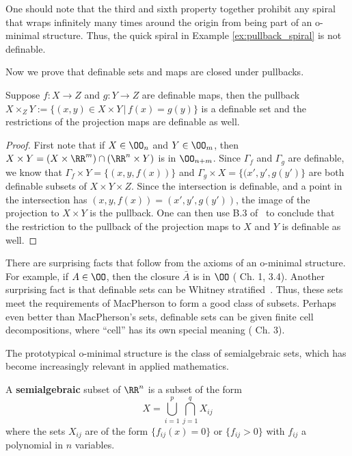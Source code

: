 \begin{rmk}
	One should note that the third and sixth property together prohibit any spiral that wraps infinitely many times around the origin from being part of an o-minimal structure. Thus, the quick spiral in Example \ref{ex:pullback_spiral} is not definable.
\end{rmk}

Now we prove that definable sets and maps are closed under pullbacks.
\begin{lem}\label{lem:def_pb}
Suppose $f:X\to Z$ and $g:Y\to Z$ are definable maps, then the pullback $X\times_Z Y:=\{(x,y)\in X\times Y\,|\, f(x)=g(y)\}$ is a definable set and the restrictions of the projection maps are definable as well.
\end{lem}
\begin{proof}
 First note that if $X\in \OO_n$ and $Y\in \OO_m$, then $X\times Y=(X\times \RR^m)\cap (\RR^n\times Y)$ is in $\OO_{n+m}$. Since $\Gamma_f$ and $\Gamma_g$ are definable, we know that $\Gamma_f\times Y=\{(x,y,f(x))\}$ and $\Gamma_g\times X=\{(x',y',g(y')\}$ are both definable subsets of $X\times Y\times Z$. Since the intersection is definable, and a point in the intersection has $(x,y,f(x))=(x',y',g(y'))$, the image of the projection to $X\times Y$ is the pullback. One can then use B.3 of~\cite{vdd-geocat} to conclude that the restriction to the pullback of the projection maps to $X$ and $Y$ is definable as well.
\end{proof}

There are surprising facts that follow from the axioms of an o-minimal structure. For example, if $A\in\OO$, then the closure $\bar{A}$ is in $\OO$ (\cite{vdd-ttos} Ch. 1, 3.4). Another surprising fact is that definable sets can be Whitney stratified~\cite{loi-verdier}. Thus, these sets meet the requirements of MacPherson to form a good class of subsets. Perhaps even better than MacPherson's sets, definable sets can be given finite cell decompositions, where ``cell'' has its own special meaning (\cite{vdd-ttos} Ch. 3).

The prototypical o-minimal structure is the class of semialgebraic sets, which has become increasingly relevant in applied mathematics.

\begin{defn}
	A \textbf{semialgebraic} subset of $\RR^n$ is a subset of the form
	\[
		X=\bigcup_{i=1}^p\bigcap_{j=1}^q X_{ij}
	\]
	where the sets $X_{ij}$ are of the form $\{f_{ij}(x)=0\}$ or $\{f_{ij}>0\}$ with $f_{ij}$ a polynomial in $n$ variables.
\end{defn}

